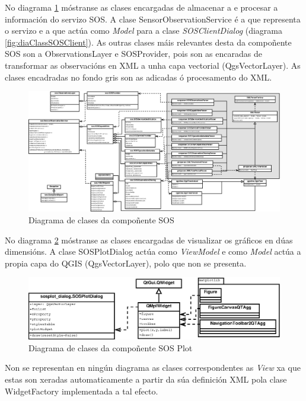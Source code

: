 No diagrama \ref{fig:diaClassSOS} móstranse as clases encargadas de almacenar a e procesar a información do servizo SOS. A clase SensorObservationService é a que representa o servizo e a que actúa como \emph{Model} para a clase \emph{SOSClientDialog} (diagrama \ref{fig:diaClassSOSClient}). As outras clases máis relevantes desta da compoñente SOS son a ObservationsLayer e SOSProvider, pois son as encaradas de transformar as observacións en XML a unha capa vectorial (QgsVectorLayer).
As clases encadradas no fondo gris son as adicadas ó procesamento do XML.
\begin{figure}
 \centering
 \includegraphics[width=\textwidth]{images/clases_sos.eps}
 \caption{Diagrama de clases da compoñente SOS}
 \label{fig:diaClassSOS}
\end{figure}

No diagrama \ref{fig:diaClassSOSPlot} móstranse as clases encargadas de visualizar os gráficos en dúas dimensións. A clase SOSPlotDialog actúa como \emph{ViewModel} e como \emph{Model} actúa a propia capa do QGIS (QgsVectorLayer), polo que non se presenta.

\begin{figure}
 \centering
 \includegraphics[width=\textwidth]{images/clases_sos_plot.eps}
 \caption{Diagrama de clases da compoñente SOS Plot}
 \label{fig:diaClassSOSPlot}
\end{figure}

Non se representan en ningún diagrama as clases correspondentes as \emph{View} xa que estas son xeradas automaticamente a partir da súa definición XML pola clase WidgetFactory implementada a tal efecto.